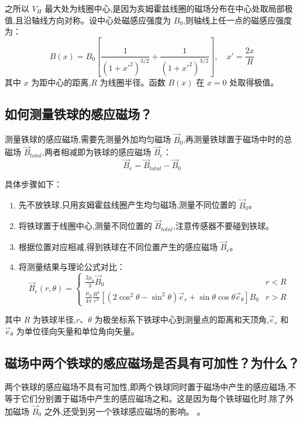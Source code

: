 \documentclass[UTF8]{ctexart}
\begin{document}
之所以 $V_H$ 最大处为线圈中心,是因为亥姆霍兹线圈的磁场分布在中心处取局部极值,且沿轴线方向对称。设中心处磁感应强度为 $B_0$,则轴线上任一点的磁感应强度为：
\begin{equation}
B(x) = B_0 \left[ \frac{1}{(1+x'^2)^{3/2}} + \frac{1}{(1+x'^2)^{3/2}} \right], \quad x' = \frac{2x}{R}
\end{equation}
其中 $x$ 为距中心的距离,$R$ 为线圈半径。函数 $B(x)$ 在 $x=0$ 处取得极值。

\subsection{如何测量铁球的感应磁场？}
测量铁球的感应磁场,需要先测量外加均匀磁场 $\vec{B}_0$,再测量铁球置于磁场中时的总磁场 $\vec{B}_{total}$,两者相减即为铁球的感应磁场 $\vec{B}_e$：
\begin{equation}
\vec{B}_e = \vec{B}_{total} - \vec{B}_0
\end{equation}

具体步骤如下：
\begin{enumerate}
    \item 先不放铁球,只用亥姆霍兹线圈产生均匀磁场,测量不同位置的 $\vec{B}_0$。
    \item 将铁球置于线圈中心,测量不同位置的 $\vec{B}_{total}$,注意传感器不要碰到铁球。
    \item 根据位置对应相减,得到铁球在不同位置产生的感应磁场 $\vec{B}_e$。
    \item 将测量结果与理论公式对比：
    \begin{equation}
    \vec{B}_e(r,\theta) = 
    \begin{cases}
        \frac{2\mu_0}{3}\vec{B}_0 & r < R \\
        \frac{\mu_0}{4\pi}\frac{R^3}{r^3} \left[ (2\cos^2\theta-\sin^2\theta)\vec{e}_r + \sin\theta\cos\theta\vec{e}_{\theta} \right]B_0 & r > R
    \end{cases}
    \end{equation}
\end{enumerate}

其中 $R$ 为铁球半径,$r$、$\theta$ 为极坐标系下铁球中心到测量点的距离和天顶角,$\vec{e}_r$ 和 $\vec{e}_{\theta}$ 为单位径向矢量和单位角向矢量。

\subsection{磁场中两个铁球的感应磁场是否具有可加性？为什么？}
两个铁球的感应磁场不具有可加性,即两个铁球同时置于磁场中产生的感应磁场,不等于它们分别置于磁场中产生的感应磁场之和。这是因为每个铁球磁化时,除了外加磁场 $\vec{B}_0$ 之外,还受到另一个铁球感应磁场的影响。
。
\end{document}
